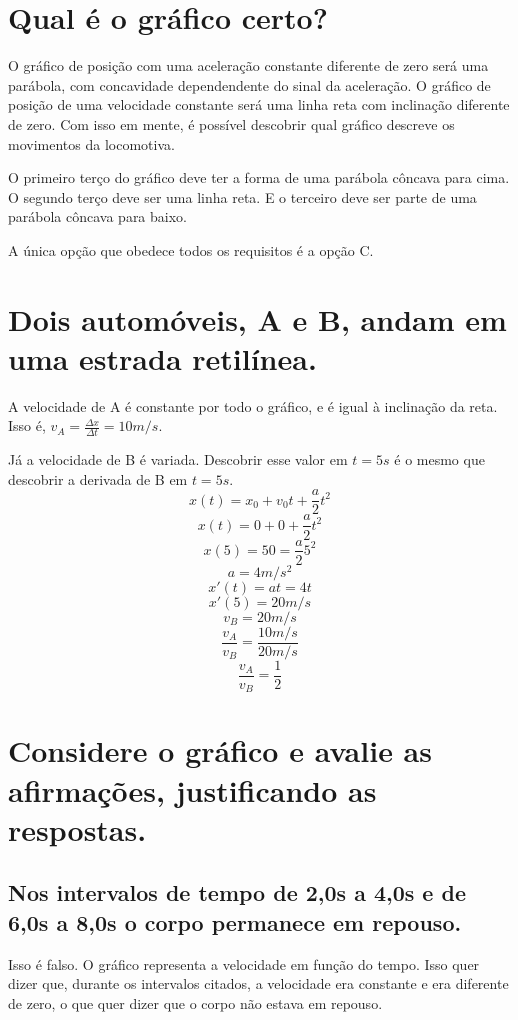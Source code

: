 \documentclass{article}
\begin{document}
\section{Qual é o gráfico certo?}
    \hspace{\parindent}O gráfico de posição com uma aceleração constante diferente de zero será uma parábola, com concavidade dependendente do sinal da aceleração. O gráfico de posição de uma velocidade constante será uma linha reta com inclinação diferente de zero. Com isso em mente, é possível descobrir qual gráfico descreve os movimentos da locomotiva.
    \par O primeiro terço do gráfico deve ter a forma de uma parábola côncava para cima. O segundo terço deve ser uma linha reta. E o terceiro deve ser parte de uma parábola côncava para baixo.
    \par A única opção que obedece todos os requisitos é a opção C.

\section{Dois automóveis, A e B, andam em uma estrada retilínea.}
    \hspace{\parindent}A velocidade de A é constante por todo o gráfico, e é igual à inclinação da reta. Isso é, \(v_A=\frac{\Delta x}{\Delta t}=10m/s\).
    \par Já a velocidade de B é variada. Descobrir esse valor em \(t=5s\) é o mesmo que descobrir a derivada de B em \(t=5s\).
    \[x(t)=x_0+v_0t+\frac{a}{2}t^2\]
    \[x(t)=0+0+\frac{a}{2}t^2\]
    \[x(5)=50=\frac{a}{2}5^2\]
    \[a=4m/s^2\]
    \[x'(t)=at=4t\]
    \[x'(5)=20m/s\]
    \[v_B=20m/s\]
    \[\frac{v_A}{v_B}=\frac{10m/s}{20m/s}\]
    \[\frac{v_A}{v_B}=\frac{1}{2}\]

\section{Considere o gráfico e avalie as afirmações, justificando as respostas.}
    \subsection{Nos intervalos de tempo de 2,0s a 4,0s e de 6,0s a 8,0s o corpo permanece em repouso.}
        \hspace{\parindent} Isso é falso. O gráfico representa a velocidade em função do tempo. Isso quer dizer que, durante os intervalos citados, a velocidade era constante e era diferente de zero, o que quer dizer que o corpo não estava em repouso.
\end{document}
